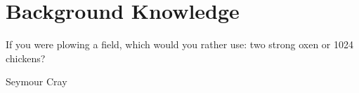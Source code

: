 \chapter{Background Knowledge}
\label{capitolo2}
\thispagestyle{empty}

\epigraph{If you were plowing a field, which would you rather use: two strong oxen or 1024 chickens?}{Seymour Cray}

\noindent {}
